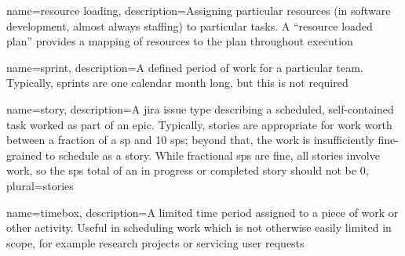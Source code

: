 {
 name={resource loading},
 description={Assigning particular resources (in software development, almost always staffing) to particular tasks.
              A ``resource loaded plan'' provides a mapping of resources to the plan throughout execution}
}



{
 name=sprint,
 description={A defined period of work for a particular team.
               Typically, sprints are one calendar month long, but this is not required}
}


{
 name=story,
 description={A \gls{jira} issue type describing a scheduled, self-contained task worked as part of an \gls{epic}.
              Typically, stories are appropriate for work worth between a fraction of a \gls{sp} and 10 \glspl{sp}; beyond that, the work is insufficiently fine-grained to schedule as a story.
              While fractional \glspl{sp} are fine, all stories involve work, so the \glspl{sp} total of an in progress or completed story should not be 0},
 plural=stories
}



{
 name=timebox,
 description={A limited time period assigned to a piece of work or other activity.
              Useful in scheduling work which is not otherwise easily limited in scope, for example research projects or servicing user requests}
}

